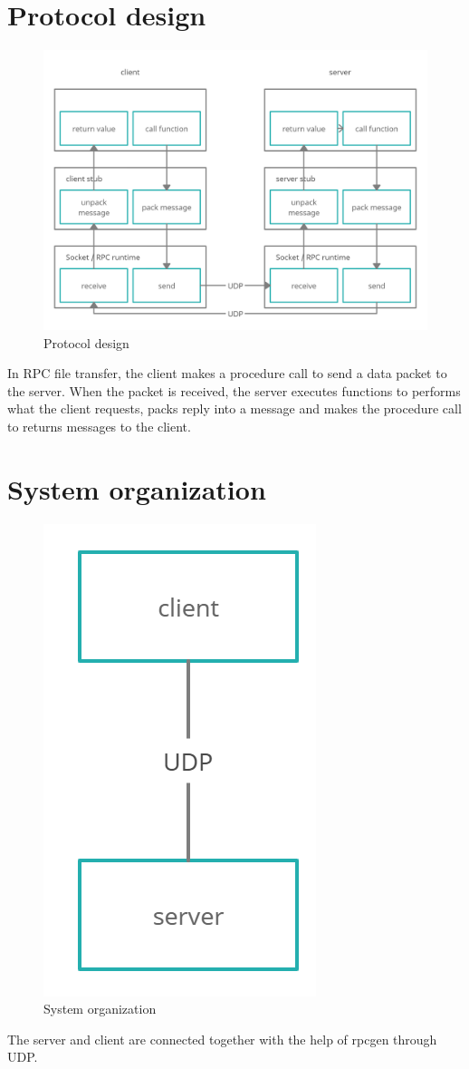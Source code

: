 \documentclass[times, 10pt]{thesisMDH}
\begin{document}
\titlePage

\newpage

\mainmatter

\section{Protocol design}
\begin{figure}[H]
    \centering
    \includegraphics[width = 1\linewidth]{images/2-1.png}
    \caption{Protocol design}
\end{figure}
In RPC file transfer, the client makes a procedure call to send a
data packet to the server. When the packet is received, the server executes functions to performs what the client requests, packs reply into a message and makes the procedure call to returns messages to the client.

\section{System organization}
\begin{figure}[H]
    \centering
    \includegraphics[width = 0.2\linewidth]{images/2-2.png}
    \caption{System organization}
\end{figure}
The server and client are connected together with the help of rpcgen through UDP. 
\end{document}
